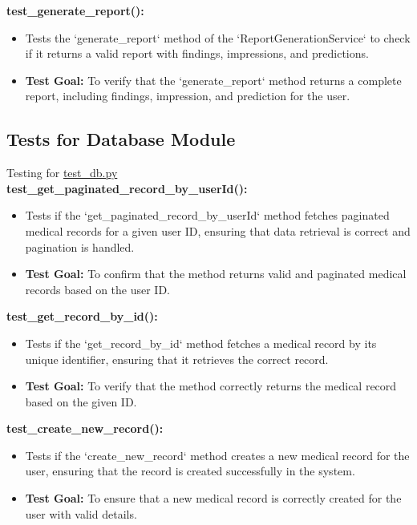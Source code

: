 \documentclass[12pt, titlepage]{article}
\begin{document}
\begin{enumerate}
\begin{enumerate}
\begin{enumerate}
\textbf{test\_generate\_report():}  
\begin{itemize}
    \item Tests the `generate\_report` method of the `ReportGenerationService` to check if it returns a valid report with findings, impressions, and predictions.
    \item \textbf{Test Goal:} To verify that the `generate\_report` method returns a complete report, including findings, impression, and prediction for the user.
    \newline
\end{itemize}

\subsection{Tests for Database Module}
Testing for \href{https://github.com/RezaJodeiri/CXR-Capstone/blob/main/src/backend/test/test_db.py}{test\_db.py} \\ 

\textbf{test\_get\_paginated\_record\_by\_userId():}  
\begin{itemize}
    \item Tests if the `get\_paginated\_record\_by\_userId` method fetches paginated medical records for a given user ID, ensuring that data retrieval is correct and pagination is handled.
    \item \textbf{Test Goal:} To confirm that the method returns valid and paginated medical records based on the user ID.
    \newline
\end{itemize}

\textbf{test\_get\_record\_by\_id():}  
\begin{itemize}
    \item Tests if the `get\_record\_by\_id` method fetches a medical record by its unique identifier, ensuring that it retrieves the correct record.
    \item \textbf{Test Goal:} To verify that the method correctly returns the medical record based on the given ID.
    \newline
\end{itemize}

\textbf{test\_create\_new\_record():}  
\begin{itemize}
    \item Tests if the `create\_new\_record` method creates a new medical record for the user, ensuring that the record is created successfully in the system.
    \item \textbf{Test Goal:} To ensure that a new medical record is correctly created for the user with valid details.
    \newline
\end{itemize}


\end{enumerate}
\end{enumerate}
\end{enumerate}
\end{document}
